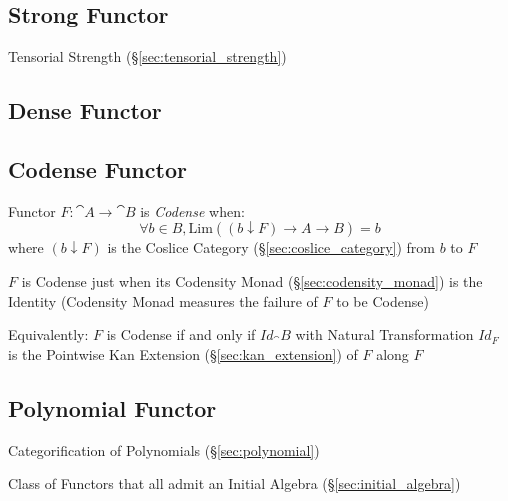 \subsection{Strong Functor}\label{sec:strong_functor}

Tensorial Strength (\S\ref{sec:tensorial_strength})



\subsection{Dense Functor}\label{sec:dense_functor}

\subsection{Codense Functor}\label{sec:codense_functor}

Functor $F : \cat{A} \rightarrow \cat{B}$ is \emph{Codense} when:
\[
  \forall b \in B,
  \mathrm{Lim}((b \downarrow F) \rightarrow A \rightarrow B) = b
\]
where $(b \downarrow F)$ is the Coslice Category
(\S\ref{sec:coslice_category}) from $b$ to $F$

$F$ is Codense just when its Codensity Monad
(\S\ref{sec:codensity_monad}) is the Identity (Codensity Monad
measures the failure of $F$ to be Codense)

Equivalently: $F$ is Codense if and only if $Id_\cat{B}$ with Natural
Transformation $Id_F$ is the Pointwise Kan Extension
(\S\ref{sec:kan_extension}) of $F$ along $F$



\subsection{Polynomial Functor} \label{sec:polynomial_functor}

Categorification of Polynomials (\S\ref{sec:polynomial})

Class of Functors that all admit an Initial Algebra
(\S\ref{sec:initial_algebra})

